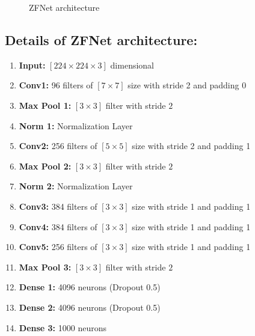\documentclass{article} %
\begin{document}
	\begin{figure}[h]
		\centering
		\caption{ZFNet architecture}
		\label{zfnet}
	\end{figure}

	\subsection*{Details of ZFNet architecture:}
	\begin{enumerate}
		\item \textbf{Input:} $[224 \times 224 \times 3]$ dimensional
		\item \textbf{Conv1:} 96 filters of $[7 \times 7]$ size with stride 2 and padding 0
		\item \textbf{Max Pool 1:} $[3 \times 3]$ filter with stride $2$
		\item \textbf{Norm 1:} Normalization Layer
		\item \textbf{Conv2:} 256 filters of $[5 \times 5]$ size with stride 2 and padding 1
		\item \textbf{Max Pool 2:} $[3 \times 3]$ filter with stride $2$
		\item \textbf{Norm 2:} Normalization Layer
		\item \textbf{Conv3:} 384 filters of $[3 \times 3]$ size with stride 1 and padding 1
		\item \textbf{Conv4:} 384 filters of $[3 \times 3]$ size with stride 1 and padding 1
		\item \textbf{Conv5:} 256 filters of $[3 \times 3]$ size with stride 1 and padding 1
		\item \textbf{Max Pool 3:} $[3 \times 3]$ filter with stride $2$
		\item \textbf{Dense 1:} 4096 neurons (Dropout 0.5)
		\item \textbf{Dense 2:} 4096 neurons (Dropout 0.5)
		\item \textbf{Dense 3:} 1000 neurons
	\end{enumerate}
\end{document}
